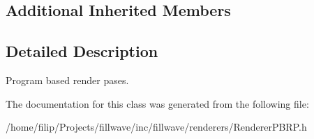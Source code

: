 \subsection*{Additional Inherited Members}


\subsection{Detailed Description}
Program based render pases. 

The documentation for this class was generated from the following file\+:\begin{DoxyCompactItemize}
\item 
/home/filip/\+Projects/fillwave/inc/fillwave/renderers/Renderer\+P\+B\+R\+P.\+h\end{DoxyCompactItemize}
